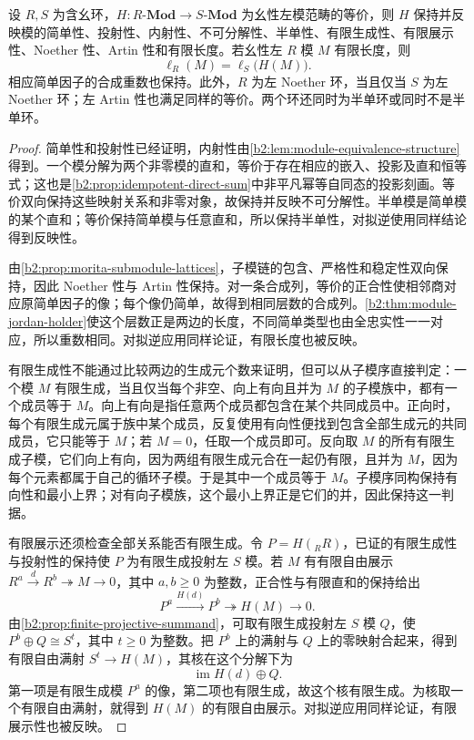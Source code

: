 \begin{proposition}\label{b2:prop:morita-invariants}
	设 \(R,S\) 为含幺环，\(H:R\text{-}\mathbf{Mod}\rightarrow S\text{-}\mathbf{Mod}\) 为幺性左模范畴的等价，则 \(H\) 保持并反映模的简单性、投射性、内射性、不可分解性、半单性、有限生成性、有限展示性、Noether 性、Artin 性和有限长度。若幺性左 \(R\) 模 \(M\) 有限长度，则
	\[
		\ell_R(M)=\ell_S\bigl(H(M)\bigr).
	\]
	相应简单因子的合成重数也保持。此外，\(R\) 为左 Noether 环，当且仅当 \(S\) 为左 Noether 环；左 Artin 性也满足同样的等价。两个环还同时为半单环或同时不是半单环。
\end{proposition}
\begin{proof}
	简单性和投射性已经证明，内射性由\cref{b2:lem:module-equivalence-structure}得到。一个模分解为两个非零模的直和，等价于存在相应的嵌入、投影及直和恒等式；这也是\cref{b2:prop:idempotent-direct-sum}中非平凡幂等自同态的投影刻画。等价双向保持这些映射关系和非零对象，故保持并反映不可分解性。半单模是简单模的某个直和；等价保持简单模与任意直和，所以保持半单性，对拟逆使用同样结论得到反映性。

	由\cref{b2:prop:morita-submodule-lattices}，子模链的包含、严格性和稳定性双向保持，因此 Noether 性与 Artin 性保持。对一条合成列，等价的正合性使相邻商对应原简单因子的像；每个像仍简单，故得到相同层数的合成列。\cref{b2:thm:module-jordan-holder}使这个层数正是两边的长度，不同简单类型也由全忠实性一一对应，所以重数相同。对拟逆应用同样论证，有限长度也被反映。

	有限生成性不能通过比较两边的生成元个数来证明，但可以从子模序直接判定：一个模 \(M\) 有限生成，当且仅当每个非空、向上有向且并为 \(M\) 的子模族中，都有一个成员等于 \(M\)。向上有向是指任意两个成员都包含在某个共同成员中。正向时，每个有限生成元属于族中某个成员，反复使用有向性便找到包含全部生成元的共同成员，它只能等于 \(M\)；若 \(M=0\)，任取一个成员即可。反向取 \(M\) 的所有有限生成子模，它们向上有向，因为两组有限生成元合在一起仍有限，且并为 \(M\)，因为每个元素都属于自己的循环子模。于是其中一个成员等于 \(M\)。子模序同构保持有向性和最小上界；对有向子模族，这个最小上界正是它们的并，因此保持这一判据。

	有限展示还须检查全部关系能否有限生成。令 \(P=H({}_RR)\)，已证的有限生成性与投射性的保持使 \(P\) 为有限生成投射左 \(S\) 模。若 \(M\) 有有限自由展示 \(R^a\xrightarrow{d}R^b\twoheadrightarrow M\to0\)，其中 \(a,b\ge0\) 为整数，正合性与有限直和的保持给出
	\[
		P^a\xrightarrow{H(d)}P^b\twoheadrightarrow H(M)\longrightarrow0.
	\]
	由\cref{b2:prop:finite-projective-summand}，可取有限生成投射左 \(S\) 模 \(Q\)，使 \(P^b\oplus Q\cong S^t\)，其中 \(t\ge0\) 为整数。把 \(P^b\) 上的满射与 \(Q\) 上的零映射合起来，得到有限自由满射 \(S^t\to H(M)\)，其核在这个分解下为
	\[
		\operatorname{im}H(d)\oplus Q.
	\]
	第一项是有限生成模 \(P^a\) 的像，第二项也有限生成，故这个核有限生成。为核取一个有限自由满射，就得到 \(H(M)\) 的有限自由展示。对拟逆应用同样论证，有限展示性也被反映。


\end{proof}

